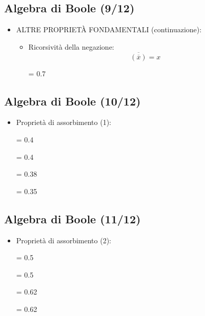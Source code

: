 \documentclass[10pt,a4paper,twoside,twocolumn]{article}
\begin{document}
\subsection{Algebra di Boole (9/12)}
\begin{itemize}
\item
ALTRE PROPRIET\`A FONDAMENTALI (continuazione):
\begin{itemize}
\item
Ricorsivit\`a della negazione:
\[ \overline{\left(\overline{x}\right)} = x \]
\begin{center}
\epsfxsize = 0.7 \columnwidth
{}
\end{center}
\end{itemize}
\end{itemize}



\subsection{Algebra di Boole (10/12)}
\begin{itemize}
\item
Propriet\`a di assorbimento (1):

\epsfxsize = 0.4 \columnwidth
{}
\vspace{2mm}

\epsfxsize = 0.4 \columnwidth
{}
\vspace{2mm}

\epsfxsize = 0.38 \columnwidth
{}
\vspace{2mm}

\epsfxsize = 0.35 \columnwidth
{}
\end{itemize}



\subsection{Algebra di Boole (11/12)}
\begin{itemize}
\item
Propriet\`a di assorbimento (2):

\epsfxsize = 0.5 \columnwidth
{}
\vspace{2mm}

\epsfxsize = 0.5 \columnwidth
{}
\vspace{2mm}

\epsfxsize = 0.62 \columnwidth
{}
\vspace{2mm}

\epsfxsize = 0.62 \columnwidth
{}
\end{itemize}
\end{document}
